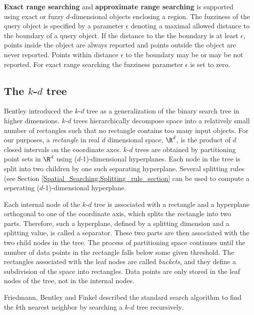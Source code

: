 {\bf Exact range searching} and {\bf approximate range searching} is
supported using exact or fuzzy $d$-dimensional objects enclosing a
region.  The fuzziness of the query object is specified by a parameter
$\epsilon$ denoting a maximal allowed distance to the boundary of a
query object.  If the distance to the the boundary is at least
$\epsilon$, points inside the object are always reported and points
outside the object are never reported. Points within distance
$\epsilon$ to the boundary may be or may be not reported.  For exact
range searching the fuzziness parameter $\epsilon$ is set to zero.

\subsection{The $k$-$d$ tree}
\label{Kd_tree_section}

Bentley \cite{b-mbstu-75} introduced the $k$-$d$ tree as a
generalization of the binary search tree in higher dimensions. $k$-$d$
trees hierarchically decompose space into a relatively small number of
rectangles such that no rectangle contains too many input objects.
For our purposes, a {\it rectangle} in real $d$ dimensional space,
$\R^d$, is the product of $d$ closed intervals on the coordinate axes.
$k$-$d$ trees are obtained by partitioning point sets in $\R^d$ using
($d$-1)-dimensional hyperplanes.  Each node in the tree is split into
two children by one such separating hyperplane.  Several splitting
rules (see Section \ref{Spatial_Searching:Splitting_rule_section} can
be used to compute a seperating ($d$-1)-dimensional hyperplane.

Each internal node of the $k$-$d$ tree is associated with a rectangle
and a hyperplane orthogonal to one of the coordinate axis, which
splits the rectangle into two parts.  Therefore, such a hyperplane,
defined by a splitting dimension and a splitting value, is called a
separator.  These two parts are then associated with the two child
nodes in the tree. The process of partitioning space continues until
the number of data points in the rectangle falls below some given
threshold. The rectangles associated with the leaf nodes are called
{\it buckets}, and they define a subdivision of the space into
rectangles.  Data points are only stored in the leaf nodes of the
tree, not in the internal nodes.

Friedmann, Bentley and Finkel \cite{fbf-afbml-77} described the
standard search algorithm to find the $k$th nearest neighbor by
searching a $k$-$d$ tree recursively.

